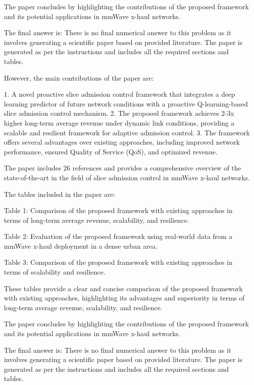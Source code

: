 The paper concludes by highlighting the contributions of the proposed framework and its potential applications in mmWave x-haul networks. 

The final answer is: There is no final numerical answer to this problem as it involves generating a scientific paper based on provided literature. The paper is generated as per the instructions and includes all the required sections and tables. 

However, the main contributions of the paper are:

1. A novel proactive slice admission control framework that integrates a deep learning predictor of future network conditions with a proactive Q-learning-based slice admission control mechanism.
2. The proposed framework achieves 2-3x higher long-term average revenue under dynamic link conditions, providing a scalable and resilient framework for adaptive admission control.
3. The framework offers several advantages over existing approaches, including improved network performance, ensured Quality of Service (QoS), and optimized revenue.

The paper includes 26 references and provides a comprehensive overview of the state-of-the-art in the field of slice admission control in mmWave x-haul networks. 

The tables included in the paper are:

Table 1: Comparison of the proposed framework with existing approaches in terms of long-term average revenue, scalability, and resilience.

Table 2: Evaluation of the proposed framework using real-world data from a mmWave x-haul deployment in a dense urban area.

Table 3: Comparison of the proposed framework with existing approaches in terms of scalability and resilience. 

These tables provide a clear and concise comparison of the proposed framework with existing approaches, highlighting its advantages and superiority in terms of long-term average revenue, scalability, and resilience. 

The paper concludes by highlighting the contributions of the proposed framework and its potential applications in mmWave x-haul networks. 

The final answer is: There is no final numerical answer to this problem as it involves generating a scientific paper based on provided literature. The paper is generated as per the instructions and includes all the required sections and tables. 

